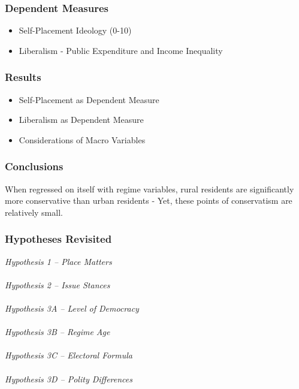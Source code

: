 \documentclass[20pt]{beamer}
\newcommand\e{\emph}
\begin{document}
\begin{frame}

\frametitle{Dependent Measures}
\begin{itemize}
	\item Self-Placement Ideology (0-10)
	\item Liberalism - Public Expenditure and Income Inequality
\end{itemize}
\end{frame}

\begin{frame}

\frametitle{Results}
\begin{itemize}
	\item Self-Placement as Dependent Measure
	\item Liberalism as Dependent Measure
	\item Considerations of Macro Variables
\end{itemize}
\end{frame}

\begin{frame}
\frametitle{Conclusions}
When regressed on itself with regime variables, rural residents are significantly more conservative than urban residents - Yet, these points of conservatism are relatively small.
\end{frame}

\begin{frame}
\footnotesize
\frametitle{Hypotheses Revisited}

\e {Hypothesis 1 -- Place Matters} \\
~~\\
\e{Hypothesis 2 -- Issue Stances} \\
~~\\
\e{Hypothesis 3A -- Level of Democracy} \\
~~\\
\e{Hypothesis 3B -- Regime Age} \\
~~\\
\e{Hypothesis 3C -- Electoral Formula}\\
~~\\
\e{Hypothesis 3D -- Polity Differences} 

\end{frame}
\endgroup
\end{document}
